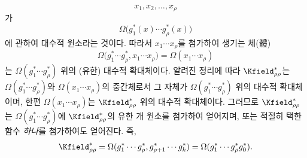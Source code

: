 
\[
x_1,x_2,\ldots,x_\rho
\]
가
\[
\Omega\bigl(g_1^*(x)\cdots g_\rho^*(x)\bigr)
\]
에 관하여 대수적 원소라는 것이다. 따라서 $x_1\cdots x_\rho$를 첨가하여 생기는 체(體)
\[
\Omega\bigl(g_1^*\cdots g_\rho^*,x_1\cdots x_\rho\bigr)=\Omega(x_1\cdots x_\rho)
\]
는 $\Omega(g_1^*\cdots g_\rho^*)$ 위의 (유한) 대수적 확대체이다. 알려진 정리에 따라 $\Kfield^*_{\rho\rho}$는 $\Omega(g_1^*\cdots g_\rho^*)$와 $\Omega(x_1\cdots x_\rho)$의 중간체로서 그 자체가 $\Omega(g_1^*\cdots g_\rho^*)$ 위의 대수적 확대체이며, 한편 $\Omega(x_1\cdots x_\rho)$는 $\Kfield^*_{\rho\rho}$ 위의 대수적 확대체이다. 그러므로 $\Kfield^*_{\rho\rho}$는 $\Omega(g_1^*\cdots g_\rho^*)$에 $\Kfield^*_{\rho\rho}$의 유한 개 원소를 첨가하여 얻어지며, 또는 적절히 택한 함수 \emph{하나}를 첨가하여도 얻어진다. 즉,
\[
\Kfield^*_{\rho\rho}
=\Omega(g_1^*\cdots g_\rho^*,g_{\rho+1}^*\cdots g_k^*)
=\Omega(g_1^*\cdots g_\rho^*g_0^*).
\]
